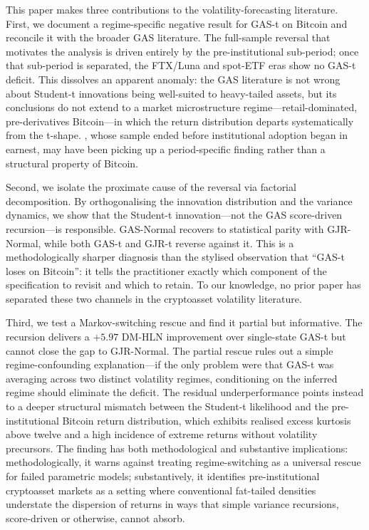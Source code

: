 This paper makes three contributions to the volatility-forecasting literature. First, we document a regime-specific negative result for GAS-t on Bitcoin and reconcile it with the broader GAS literature. The full-sample reversal that motivates the analysis is driven entirely by the pre-institutional sub-period; once that sub-period is separated, the FTX/Luna and spot-ETF eras show no GAS-t deficit. This dissolves an apparent anomaly: the GAS literature is not wrong about Student-t innovations being well-suited to heavy-tailed assets, but its conclusions do not extend to a market microstructure regime---retail-dominated, pre-derivatives Bitcoin---in which the return distribution departs systematically from the t-shape. \citet{catania2017}, whose sample ended before institutional adoption began in earnest, may have been picking up a period-specific finding rather than a structural property of Bitcoin.

Second, we isolate the proximate cause of the reversal via factorial decomposition. By orthogonalising the innovation distribution and the variance dynamics, we show that the Student-t innovation---not the GAS score-driven recursion---is responsible. GAS-Normal recovers to statistical parity with GJR-Normal, while both GAS-t and GJR-t reverse against it. This is a methodologically sharper diagnosis than the stylised observation that ``GAS-t loses on Bitcoin'': it tells the practitioner exactly which component of the specification to revisit and which to retain. To our knowledge, no prior paper has separated these two channels in the cryptoasset volatility literature.

Third, we test a Markov-switching rescue and find it partial but informative. The \citet{klaassen2002} recursion delivers a $+5.97$ DM-HLN improvement over single-state GAS-t but cannot close the gap to GJR-Normal. The partial rescue rules out a simple regime-confounding explanation---if the only problem were that GAS-t was averaging across two distinct volatility regimes, conditioning on the inferred regime should eliminate the deficit. The residual underperformance points instead to a deeper structural mismatch between the Student-t likelihood and the pre-institutional Bitcoin return distribution, which exhibits realised excess kurtosis above twelve and a high incidence of extreme returns without volatility precursors. The finding has both methodological and substantive implications: methodologically, it warns against treating regime-switching as a universal rescue for failed parametric models; substantively, it identifies pre-institutional cryptoasset markets as a setting where conventional fat-tailed densities understate the dispersion of returns in ways that simple variance recursions, score-driven or otherwise, cannot absorb.

